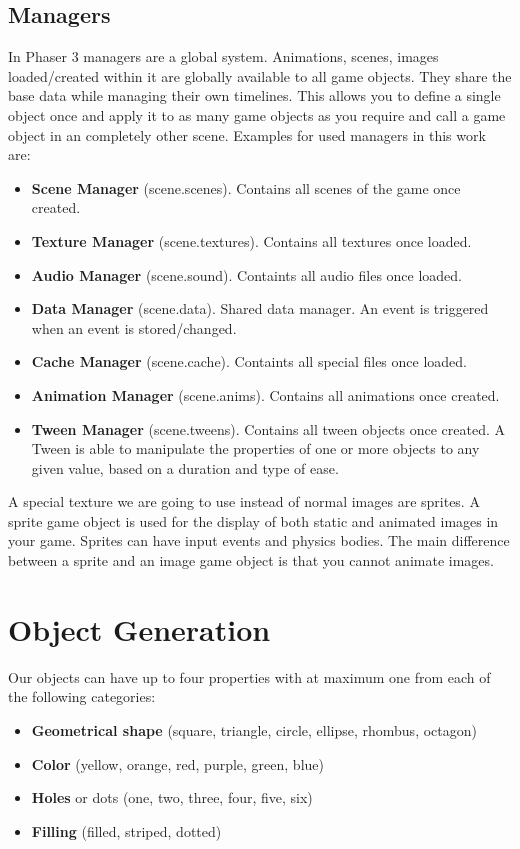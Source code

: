 \subsection{Managers}\label{subsec:managers}
In Phaser 3 managers are a global system.
Animations, scenes, images loaded/created within it are globally available to all game objects.
They share the base data while managing their own timelines.
This allows you to define a single object once and apply it to as many game objects as you require and
call a game object in an completely other scene.
Examples for used managers in this work are:

\begin{itemize}
    \item \textbf{Scene Manager} (scene.scenes). Contains all scenes of the game once created.
    \item \textbf{Texture Manager} (scene.textures). Contains all textures once loaded.
    \item \textbf{Audio Manager} (scene.sound). Containts all audio files once loaded.
    \item \textbf{Data Manager} (scene.data). Shared data manager. An event is triggered when an event is stored/changed.
    \item \textbf{Cache Manager} (scene.cache). Containts all special files once loaded.
    \item \textbf{Animation Manager} (scene.anims). Contains all animations once created.
    \item \textbf{Tween Manager} (scene.tweens). Contains all tween objects once created.
    A Tween is able to manipulate the properties of one or more objects to any given value, based
    on a duration and type of ease.
\end{itemize}

A special texture we are going to use instead of normal images are sprites.
A sprite game object is used for the display of both static and animated images in your game.
Sprites can have input events and physics bodies.
The main difference between a sprite and an image game object is that you cannot animate images.

\section{Object Generation}\label{sec:object-generation}
Our objects can have up to four properties with at maximum one from each of the following categories:
\begin{itemize}
    \item \textbf{Geometrical shape} (square, triangle, circle, ellipse, rhombus, octagon)
    \item \textbf{Color} (yellow, orange, red, purple, green, blue)
    \item \textbf{Holes} or dots (one, two, three, four, five, six)
    \item \textbf{Filling} (filled, striped, dotted)
\end{itemize}

